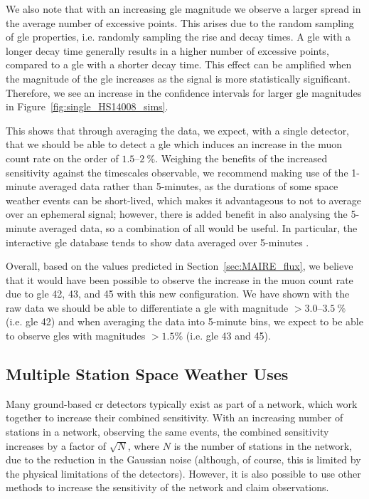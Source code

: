 We also note that with an increasing \gls{gle} magnitude we observe a larger spread in the average number of excessive points. This arises due to the random sampling of \gls{gle} properties, i.e. randomly sampling the rise and decay times. A \gls{gle} with a longer decay time generally results in a higher number of excessive points, compared to a \gls{gle} with a shorter decay time. This effect can be amplified when the magnitude of the \gls{gle} increases as the signal is more statistically significant. Therefore, we see an increase in the confidence intervals for larger \gls{gle} magnitudes in Figure~\ref{fig:single_HS14008_sims}.


This shows that through averaging the data, we expect, with a single detector, that we should be able to detect a \gls{gle} which induces an increase in the muon count rate on the order of $1.5$--$2~\%$. Weighing the benefits of the increased sensitivity against the timescales observable, we recommend making use of the 1-minute averaged data rather than 5-minutes, as the durations of some space weather events can be short-lived, which makes it advantageous to not to average over an ephemeral signal; however, there is added benefit in also analysing the 5-minute averaged data, so a combination of all would be useful. In particular, the interactive \gls{gle} database tends to show data averaged over 5-minutes \citep{usoskin_database_2016}.

Overall, based on the values predicted in Section~\ref{sec:MAIRE_flux}, we believe that it would have been possible to observe the increase in the muon count rate due to \gls{gle} 42, 43, and 45 with this new configuration. We have shown with the raw data we should be able to differentiate a \gls{gle} with magnitude $>3.0$--$3.5~\%$ (i.e. \gls{gle} 42) and when averaging the data into 5-minute bins, we expect to be able to observe \glspl{gle} with magnitudes $> 1.5 \%$  (i.e. \gls{gle} 43 and 45). 


\subsection{Multiple Station Space Weather Uses}\label{sec:HS_14008_multi_sims}


Many ground-based \gls{cr} detectors typically exist as part of a network, which work together to increase their combined sensitivity. With an increasing number of stations in a network, observing the same events, the combined sensitivity increases by a factor of $\sqrt{N}$, where $N$ is the number of stations in the network, due to the reduction in the Gaussian noise (although, of course, this is limited by the physical limitations of the detectors). However, it is also possible to use other methods to increase the sensitivity of the network and claim observations.

